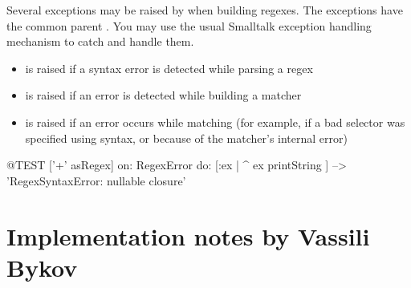 \documentclass[a4paper,10pt,twoside]{book}
\begin{document}
{Several exceptions may be raised by  when building regexes.  The exceptions have the common parent .  You may use the usual Smalltalk exception handling mechanism to catch and handle them.

\begin{itemize}

\item {} is raised if a syntax error is detected while parsing a regex

\item {} is raised if an error is detected while building a matcher

\item {} is raised if an error occurs while matching (for example, if a bad selector was specified using  syntax, or because of the matcher's internal error)



\end{itemize}


\begin{code}{@TEST}
['+' asRegex] on: RegexError do: [:ex | ^ ex printString ]                                        --> 'RegexSyntaxError:  nullable closure'
\end{code}
\section{Implementation notes by Vassili Bykov}

}
\end{document}
